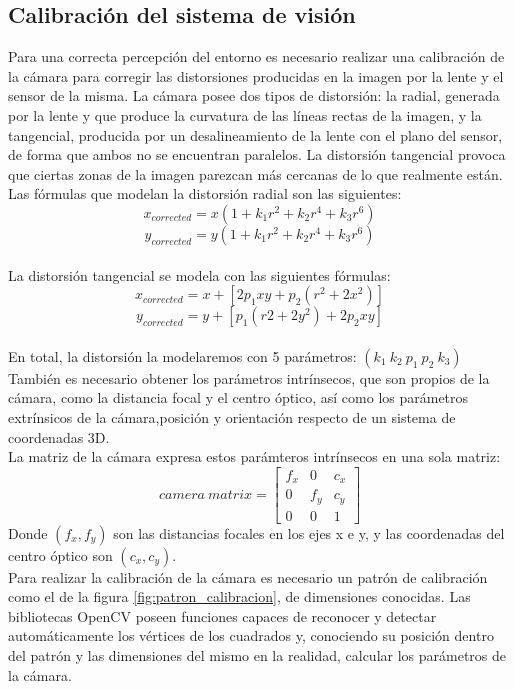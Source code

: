\subsection{Calibración del sistema de visión}
\label{calibracion}
Para una correcta percepción del entorno es necesario realizar una calibración de la cámara para corregir las distorsiones producidas en la imagen por la lente y el sensor de la misma. La cámara posee dos tipos de distorsión: la radial, generada por la lente y que produce la curvatura de las líneas rectas de la imagen, y la tangencial, producida por un desalineamiento de la lente con el plano del sensor, de forma que ambos no se encuentran paralelos. La distorsión tangencial provoca que ciertas zonas de la imagen parezcan más cercanas de lo que realmente están.\\

Las fórmulas que modelan la distorsión radial son las siguientes:
\[x_{corrected} = x (1 + k_1 r^2 + k_2 r^4 + k_3 r^6)\]
\[y_{corrected} = y (1 + k_1 r^2 + k_2 r^4 + k_3 r^6)\]
~\\
 
La distorsión tangencial se modela con las siguientes fórmulas:
\[x_{corrected} = x + \left[2 p_1 x y + p_2 (r^2 + 2 x^2) \right] \]
\[y_{corrected} = y + \left[p_1 (r2 + 2 y^2) + 2 p_2 x y \right] \]
~\\

En total, la distorsión la modelaremos con 5 parámetros: $(k_1 ~ k_2 ~ p_1 ~ p_2 ~ k_3)$\\

También es necesario obtener los parámetros intrínsecos, que son propios de la cámara, como la distancia focal y el centro óptico, así como los parámetros extrínsicos de la cámara,posición y orientación respecto de un sistema de coordenadas 3D.\\

La matriz de la cámara expresa estos parámteros intrínsecos en una sola matriz:
\[camera ~matrix = \begin{bmatrix} f_x & 0 & c_x \\ 0 & f_y & c_y \\ 0 & 0 & 1 \end{bmatrix}\]
Donde $(f_x, f_y)$ son las distancias focales en los ejes x e y, y  las coordenadas del centro óptico son $(c_x, c_y)$.\\

Para realizar la calibración de la cámara es necesario un patrón de calibración como el de la figura \ref{fig:patron_calibracion}, de dimensiones conocidas. Las bibliotecas OpenCV poseen funciones capaces de reconocer y detectar automáticamente los vértices de los cuadrados y, conociendo su posición dentro del patrón y las dimensiones del mismo en la realidad, calcular los parámetros de la cámara.\\

